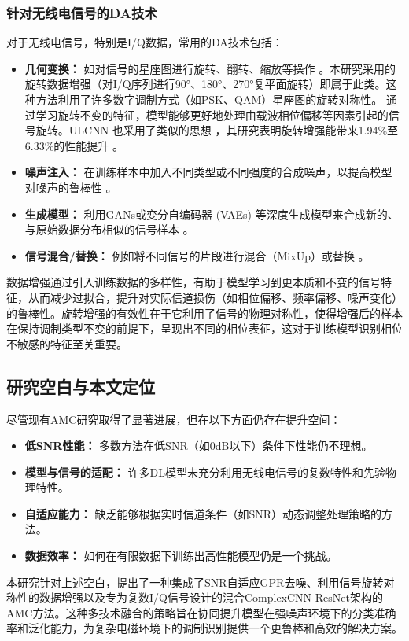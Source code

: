 \documentclass[conference]{IEEEtran}
\begin{document}
\subsubsection{针对无线电信号的DA技术}
对于无线电信号，特别是I/Q数据，常用的DA技术包括：
\begin{itemize}
    \item \textbf{几何变换：} 如对信号的星座图进行旋转、翻转、缩放等操作 \cite{[19]}\cite{[49_MISSING]}\cite{[57_MISSING]}\cite{[58_MISSING]}\cite{[59_MISSING]}。本研究采用的旋转数据增强（对I/Q序列进行90°、180°、270°复平面旋转）即属于此类。这种方法利用了许多数字调制方式（如PSK、QAM）星座图的旋转对称性。 %
    通过学习旋转不变的特征，模型能够更好地处理由载波相位偏移等因素引起的信号旋转。ULCNN \cite{b1} 也采用了类似的思想 \cite{[23_MISSING]}\cite{b1}，其研究表明旋转增强能带来1.94\%至6.33\%的性能提升 \cite{b1}。
    \item \textbf{噪声注入：} 在训练样本中加入不同类型或不同强度的合成噪声，以提高模型对噪声的鲁棒性 \cite{[59_MISSING]}。
    \item \textbf{生成模型：} 利用GANs或变分自编码器 (VAEs) 等深度生成模型来合成新的、与原始数据分布相似的信号样本 \cite{[19]}\cite{[51_MISSING]}\cite{[60_MISSING]}。
    \item \textbf{信号混合/替换：} 例如将不同信号的片段进行混合（MixUp）或替换 \cite{[60_MISSING]}\cite{[61_MISSING]}。
\end{itemize}
数据增强通过引入训练数据的多样性，有助于模型学习到更本质和不变的信号特征，从而减少过拟合，提升对实际信道损伤（如相位偏移、频率偏移、噪声变化）的鲁棒性。旋转增强的有效性在于它利用了信号的物理对称性，使得增强后的样本在保持调制类型不变的前提下，呈现出不同的相位表征，这对于训练模型识别相位不敏感的特征至关重要。

\subsection{研究空白与本文定位}
尽管现有AMC研究取得了显著进展，但在以下方面仍存在提升空间：
\begin{itemize}
    \item \textbf{低SNR性能：} 多数方法在低SNR（如0dB以下）条件下性能仍不理想。
    \item \textbf{模型与信号的适配：} 许多DL模型未充分利用无线电信号的复数特性和先验物理特性。
    \item \textbf{自适应能力：} 缺乏能够根据实时信道条件（如SNR）动态调整处理策略的方法。
    \item \textbf{数据效率：} 如何在有限数据下训练出高性能模型仍是一个挑战。
\end{itemize}
本研究针对上述空白，提出了一种集成了SNR自适应GPR去噪、利用信号旋转对称性的数据增强以及专为复数I/Q信号设计的混合ComplexCNN-ResNet架构的AMC方法。这种多技术融合的策略旨在协同提升模型在强噪声环境下的分类准确率和泛化能力，为复杂电磁环境下的调制识别提供一个更鲁棒和高效的解决方案。
\end{document}
